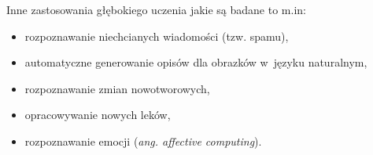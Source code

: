 Inne zastosowania głębokiego uczenia jakie są badane to m.in:
\begin{itemize}
  \item rozpoznawanie niechcianych wiadomości (tzw. spamu),
  \item automatyczne generowanie opisów dla obrazków w~języku naturalnym,
  \item rozpoznawanie zmian nowotworowych,
  \item opracowywanie nowych leków,
  \item rozpoznawanie emocji (\textit{ang. affective computing}).
\end{itemize}